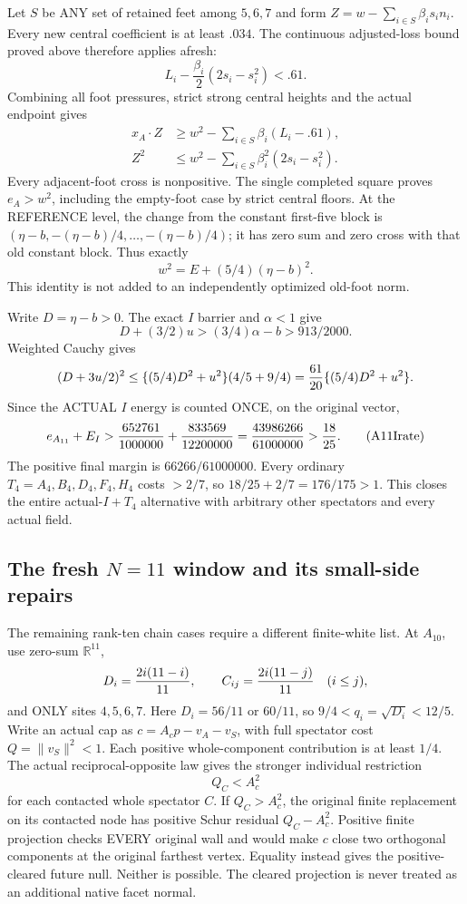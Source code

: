 \documentclass[11pt]{article}
\begin{document}
Let \(S\) be ANY set of retained feet among
\(5,6,7\) and form
\(Z=w-\sum_{i\in S}\beta_i s_i n_i\).
Every new central coefficient is at least
\(.034\).
The continuous adjusted-loss bound proved
above therefore applies afresh:
\[
 L_i-\frac{\beta_i}{2}(2s_i-s_i^2)<.61 .
\]
Combining all foot pressures, strict strong
central heights and the actual endpoint gives
\[
 \begin{split}
 x_A\cdot Z&\ge w^2-\sum_{i\in S}\beta_i(L_i-.61),\\
 Z^2&\le w^2-\sum_{i\in S}\beta_i^2(2s_i-s_i^2).
 \end{split}
\]
Every adjacent-foot cross is nonpositive.
The single completed square proves \(e_A>w^2\),
including the empty-foot case by strict
central floors.
At the REFERENCE level, the change from
the constant first-five block is
\((\eta-b,-(\eta-b)/4,\ldots,-(\eta-b)/4)\);
it has zero sum and zero cross with that
old constant block.
Thus exactly
\[
                      w^2=E+(5/4)(\eta-b)^2 .
\]
This identity is not added to an independently
optimized old-foot norm.

Write \(D=\eta-b>0\).
The exact \(I\) barrier and \(\alpha<1\) give
\[
 D+(3/2)u>(3/4)\alpha-b>913/2000 .
\]
Weighted Cauchy gives
\[
 (D+3u/2)^2
       \le\{(5/4)D^2+u^2\}(4/5+9/4)
       ={61\over20}\{(5/4)D^2+u^2\}.
\]
Since the ACTUAL \(I\) energy is counted
ONCE, on the original vector,
\[
 e_{A_{11}}+E_I
 >{652761\over1000000}+{833569\over12200000}
 ={43986266\over61000000}>{18\over25}.
\tag{A11Irate}\label{eq:arithA11Ijoint}
\]
The positive final margin is
\(66266/61000000\).
Every ordinary \(T_4=A_4,B_4,D_4,F_4,H_4\)
costs \(>2/7\), so
\(18/25+2/7=176/175>1\).
This closes the entire actual-\(I+T_4\)
alternative with arbitrary other spectators
and every actual field.

\subsection{The fresh \(N=11\) window and its small-side repairs}
\label{app:arithA10window}

The remaining rank-ten chain cases require a
different finite-white list.
At \(A_{10}\), use zero-sum \(\mathbb R^{11}\),
\[
 D_i={2i(11-i)\over11},\qquad
 C_{ij}={2i(11-j)\over11}\quad(i\le j),
\]
and ONLY sites \(4,5,6,7\).
Here \(D_i=56/11\) or \(60/11\), so
\(9/4<q_i=\sqrt{D_i}<12/5\).
Write an actual cap as
\(c=A_cp-v_A-v_S\), with full spectator
cost \(Q=\|v_S\|^2<1\).
Each positive whole-component contribution
is at least \(1/4\).
The actual reciprocal-opposite law gives the
stronger individual restriction
\[
                         Q_C<A_c^2
\tag{A10foreign}\label{eq:arithA10foreign}
\]
for each contacted whole spectator \(C\).
If \(Q_C>A_c^2\), the original finite
replacement on its contacted node has
positive Schur residual \(Q_C-A_c^2\).
Positive finite projection checks EVERY
original wall and would make \(c\) close
two orthogonal components at the original
farthest vertex.
Equality instead gives the positive-cleared
future null.
Neither is possible.
The cleared projection is never treated as
an additional native facet normal.
\end{document}
